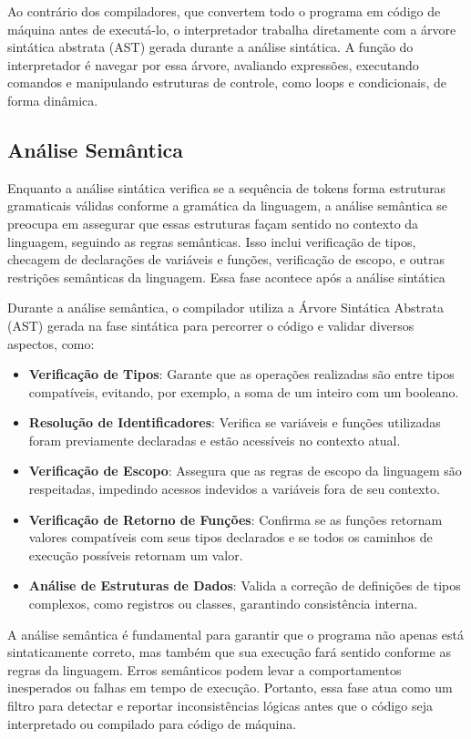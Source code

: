 \documentclass{article}
\begin{document}
Ao contrário dos compiladores, que convertem todo o programa em código de máquina antes de executá-lo, o interpretador trabalha diretamente com a árvore sintática abstrata (AST) gerada durante a análise sintática. A função do interpretador é navegar por essa árvore, avaliando expressões, executando comandos e manipulando estruturas de controle, como loops e condicionais, de forma dinâmica.

\subsection{Análise Semântica}

Enquanto a análise sintática verifica se a sequência de tokens forma estruturas gramaticais válidas conforme a gramática da linguagem, a análise semântica se preocupa em assegurar que essas estruturas façam sentido no contexto da linguagem, seguindo as regras semânticas. Isso inclui verificação de tipos, checagem de declarações de variáveis e funções, verificação de escopo, e outras restrições semânticas da linguagem. Essa fase acontece após a análise sintática

Durante a análise semântica, o compilador utiliza a Árvore Sintática Abstrata (AST) gerada na fase sintática para percorrer o código e validar diversos aspectos, como:

\begin{itemize}
    \item \textbf{Verificação de Tipos}: Garante que as operações realizadas são entre tipos compatíveis, evitando, por exemplo, a soma de um inteiro com um booleano.
    \item \textbf{Resolução de Identificadores}: Verifica se variáveis e funções utilizadas foram previamente declaradas e estão acessíveis no contexto atual.
    \item \textbf{Verificação de Escopo}: Assegura que as regras de escopo da linguagem são respeitadas, impedindo acessos indevidos a variáveis fora de seu contexto.
    \item \textbf{Verificação de Retorno de Funções}: Confirma se as funções retornam valores compatíveis com seus tipos declarados e se todos os caminhos de execução possíveis retornam um valor.
    \item \textbf{Análise de Estruturas de Dados}: Valida a correção de definições de tipos complexos, como registros ou classes, garantindo consistência interna.
\end{itemize}

A análise semântica é fundamental para garantir que o programa não apenas está sintaticamente correto, mas também que sua execução fará sentido conforme as regras da linguagem. Erros semânticos podem levar a comportamentos inesperados ou falhas em tempo de execução. Portanto, essa fase atua como um filtro para detectar e reportar inconsistências lógicas antes que o código seja interpretado ou compilado para código de máquina.
\end{document}
